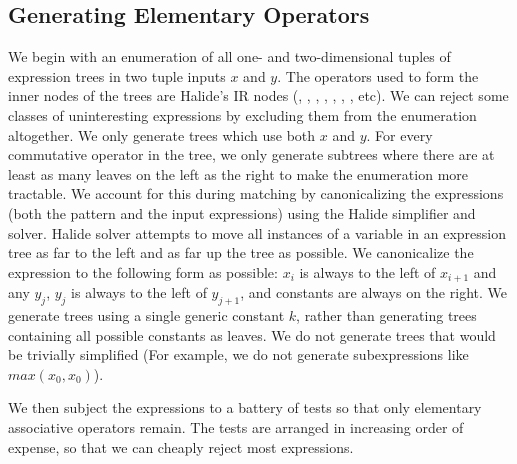 \subsection{Generating Elementary Operators}
\label{subsec:generation}

We begin with an enumeration of all one- and two-dimensional tuples of expression trees in two tuple inputs $x$ and $y$. The operators used to form the inner nodes of the trees are Halide's IR nodes (\code{*}, \code{+}, \code{-}, , , , \code{<}, etc). We can reject some classes of uninteresting expressions by excluding them from the enumeration altogether. We only generate trees which use both $x$ and $y$. For every commutative operator in the tree, we only generate subtrees where there are at least as many leaves on the left as the right to make the enumeration more tractable. We account for this during matching by canonicalizing the expressions (both the pattern and the input expressions) using the Halide simplifier and solver. Halide solver attempts to move all instances of a variable in an expression tree as far to the left and as far up the tree as possible. We canonicalize the expression to the following form as possible: $x_i$ is always to the left of $x_{i+1}$ and any $y_j$, $y_j$ is always to the left of $y_{j+1}$, and constants are always on the right. We generate trees using a single generic constant $k$, rather than generating trees containing all possible constants as leaves. We do not generate trees that would be trivially simplified (For example, we do not generate subexpressions like $max(x_0, x_0)$).

We then subject the expressions to a battery of tests so that only elementary associative operators remain. The tests are arranged in increasing order of expense, so that we can cheaply reject most expressions.

